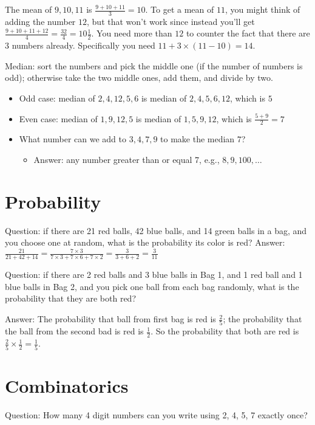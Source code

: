 \documentclass[fullpage,twocolumn]{article}
\newcommand{\vp}{{\vspace{0.1in}}}
\begin{document}
The mean of $9,10,11$ is $\frac{9+10+11}{3} = 10$. To get a mean of $11$, you might think of adding the number
$12$, but that won't work since instead you'll get $\frac{9+10+11+12}{4} = \frac{32}{4} = 10\frac{1}{2}$. You need more than $12$ to counter the fact that there are $3$ numbers
already. Specifically you need $11 + 3\times(11-10)  = 14$.

Median: sort the numbers and pick the middle one (if the number of numbers is odd); 
otherwise take the two middle ones, add them, and divide by two.
\begin{itemize}
\item Odd case: median of $2,4,12,5,6$ is median of $2,4,5,6,12$, which is $5$
\item Even case: median of $1,9,12,5$ is median of $1,5,9,12$, which is $\frac{5+9}{2}=7$
\item What number can we add to $3,4,7,9$ to make the median $7$? 
\begin{itemize}
\item Answer: any number greater than or equal 7, e.g., $8, 9, 100,\ldots$
\end{itemize} 
\end{itemize} 

\section{Probability}

Question: if there are 21 red balls, 42 blue balls, and 14 green balls 
in a bag, and you choose one at random, what is 
the probability its color is red?
\vp
Answer: $\frac{21}{21+42+14} = \frac{7\times3}{7\times 3 + 7 \times 6 + 7 \times 2} = \frac{3}{3+6+2} = \frac{3}{11}$


Question: if there are 2 red balls and 3 blue balls in Bag 1, and 1 red ball and 1 blue balls in Bag 2, and
you pick one ball from each bag randomly, what is the probability that they are both red?

\vp
Answer: The probability that ball from first bag is red is $\frac{2}{5}$; the probability that
the ball from the second bad is red is $\frac{1}{2}$. So the probability that both are red
is $\frac{2}{5}\times \frac{1}{2} = \frac{1}{5}$.

\section{Combinatorics}

Question: How many 4 digit numbers can you write using 2, 4, 5, 7 exactly once?
\end{document}
